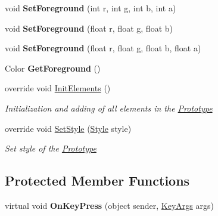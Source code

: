 \begin{DoxyCompactItemize}
\item 
\mbox{\label{class_space_v_i_l_1_1_menu_bar_a1044ec612913ff641be8e3db80817867}} 
void {\bfseries Set\+Foreground} (int r, int g, int b, int a)
\item 
\mbox{\label{class_space_v_i_l_1_1_menu_bar_a9ce72625e0315f5245fa88fc7e4fa1d2}} 
void {\bfseries Set\+Foreground} (float r, float g, float b)
\item 
\mbox{\label{class_space_v_i_l_1_1_menu_bar_ae55814480cb777d60a8887d57075e232}} 
void {\bfseries Set\+Foreground} (float r, float g, float b, float a)
\item 
\mbox{\label{class_space_v_i_l_1_1_menu_bar_a7639bc4ed96338c83d738102cde005ac}} 
Color {\bfseries Get\+Foreground} ()
\item 
override void \mbox{\hyperlink{class_space_v_i_l_1_1_menu_bar_a9873e7466eac5668ecc9df715b35ce08}{Init\+Elements}} ()
\begin{DoxyCompactList}\small\item\em Initialization and adding of all elements in the \mbox{\hyperlink{class_space_v_i_l_1_1_prototype}{Prototype}} \end{DoxyCompactList}\item 
override void \mbox{\hyperlink{class_space_v_i_l_1_1_menu_bar_a999e99bd760bb19092d309dff262ea5e}{Set\+Style}} (\mbox{\hyperlink{class_space_v_i_l_1_1_decorations_1_1_style}{Style}} style)
\begin{DoxyCompactList}\small\item\em Set style of the \mbox{\hyperlink{class_space_v_i_l_1_1_prototype}{Prototype}} \end{DoxyCompactList}\end{DoxyCompactItemize}
\subsection*{Protected Member Functions}
\begin{DoxyCompactItemize}
\item 
\mbox{\label{class_space_v_i_l_1_1_menu_bar_a80b6a0fc082de003779e79a35763abd0}} 
virtual void {\bfseries On\+Key\+Press} (object sender, \mbox{\hyperlink{class_space_v_i_l_1_1_core_1_1_key_args}{Key\+Args}} args)
\end{DoxyCompactItemize}

